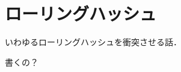 \documentclass{jsarticle}
\begin{document}
\section{ローリングハッシュ}

いわゆるローリングハッシュを衝突させる話．

書くの？
\end{document}
